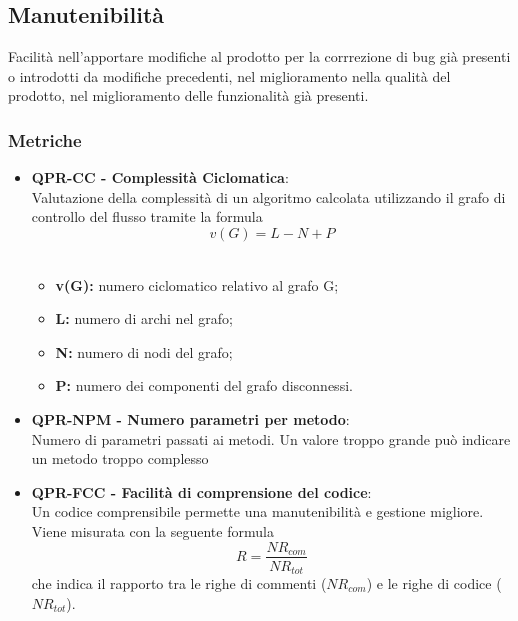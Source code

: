 \subsection{Manutenibilità}
Facilità nell'apportare modifiche al prodotto per la corrrezione di bug già presenti o introdotti da modifiche precedenti,
nel miglioramento nella qualità del prodotto, nel miglioramento delle funzionalità già presenti.
\subsubsection{Metriche}
\begin{itemize}
    \item \textbf{QPR-CC - Complessità Ciclomatica}:\\
    Valutazione della complessità di un algoritmo calcolata utilizzando il grafo di controllo del flusso tramite la formula\\
$$v(G) = L - N + P$$\\
\begin{itemize}
    \item \textbf{v(G):} numero ciclomatico relativo al grafo G; \\
    \item \textbf{L:} numero di archi nel grafo; \\
    \item \textbf{N:} numero di nodi del grafo; \\
    \item \textbf{P:} numero dei componenti del grafo disconnessi. \\
\end{itemize}
    \item \textbf{QPR-NPM - Numero parametri per metodo}:\\
     Numero di parametri passati ai metodi. Un valore troppo grande può indicare un metodo troppo complesso\\

     \item \textbf{QPR-FCC - Facilità di comprensione del codice}:\\
    Un codice comprensibile permette una manutenibilità e gestione migliore. Viene misurata con la seguente formula
    $$R = \frac{NR_{com}}{NR_{tot}}$$
    che indica il rapporto tra le righe di commenti (${NR_{com}}$) e le righe di codice (${NR_{tot}}$).
\end{itemize}

